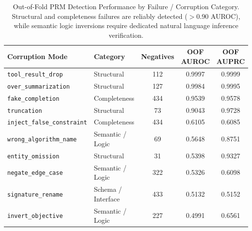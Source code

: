 \begin{table}[t]
\centering
\small
\caption{Out-of-Fold PRM Detection Performance by Failure / Corruption Category. Structural and completeness failures are reliably detected ($>$0.90 AUROC), while semantic logic inversions require dedicated natural language inference verification.}
\label{tab:corruption_robustness}
\begin{tabular}{llccc}
\toprule
\textbf{Corruption Mode} & \textbf{Category} & \textbf{Negatives} & \textbf{OOF AUROC} & \textbf{OOF AUPRC} \\
\midrule
\texttt{tool_result_drop} & Structural & 112 & 0.9997 & 0.9999 \\
\texttt{over_summarization} & Structural & 127 & 0.9984 & 0.9995 \\
\texttt{fake_completion} & Completeness & 434 & 0.9539 & 0.9578 \\
\texttt{truncation} & Structural &  73 & 0.9043 & 0.9728 \\
\texttt{inject_false_constraint} & Completeness & 434 & 0.6105 & 0.6085 \\
\texttt{wrong_algorithm_name} & Semantic / Logic &  69 & 0.5648 & 0.8751 \\
\texttt{entity_omission} & Structural &  31 & 0.5398 & 0.9327 \\
\texttt{negate_edge_case} & Semantic / Logic & 322 & 0.5326 & 0.6098 \\
\texttt{signature_rename} & Schema / Interface & 433 & 0.5132 & 0.5152 \\
\texttt{invert_objective} & Semantic / Logic & 227 & 0.4991 & 0.6561 \\
\bottomrule
\end{tabular}
\end{table}